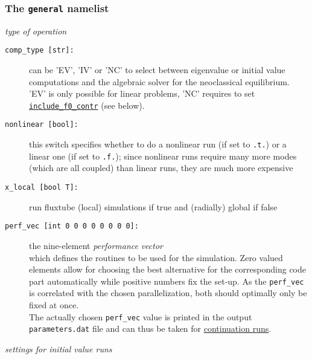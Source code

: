 \documentclass[12pt]{article}
\begin{document}
\subsubsection{The \texttt{general} namelist}
%
{\em type of operation}
\begin{description}
\item[\hypertarget{comp_type}{\texttt{comp\_type [str]:}}] can be 'EV', 'IV' or 'NC' to select between eigenvalue or initial value
computations and the algebraic solver for the neoclassical equilibrium. 'EV' is only possible for linear problems, 'NC' requires to set
\hyperlink{include_f0_contr}{\tt include\_f0\_contr} (see below).
\item[\texttt{nonlinear [bool]:}] this switch specifies whether to do a nonlinear run (if set to
\texttt{.t.}) or a linear one (if set to \texttt{.f.}); since nonlinear runs require many more
modes (which are all coupled) than linear runs, they are much more expensive
\item[\hypertarget{x_local}{\texttt{x\_local [bool T]:}}] run fluxtube (local) simulations if true and (radially) global if false
\item[\hypertarget{perf_vec}{\tt perf\_vec [int 0 0 0 0 0 0 0 0]:}] the nine-element
{\em performance} {\em vector}\\ which defines the routines to be used for the simulation.
Zero valued elements allow for choosing the best alternative for the corresponding code part
automatically while positive numbers fix the set-up. As the {\tt perf\_vec} is correlated
with the chosen parallelization, both should optimally only be fixed at once.\\
The actually chosen {\tt perf\_vec} value is printed in the output {\tt para\-me\-ters.dat} file and
can thus be taken for \hyperref[subsubsec:continue_sim]{continuation runs}.
\end{description}
%
{\em settings for initial value runs}
\end{document}
